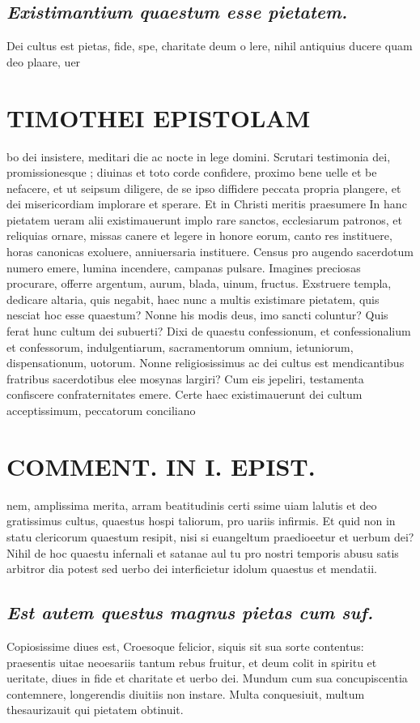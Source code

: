 \documentclass{article}
\begin{document}
\begin{pages}
\subsection*{\textit{Existimantium quaestum esse pietatem. }}\pstart Dei cultus est pietas, fide, spe, charitate deum o lere, nihil antiquius ducere quam deo plaare, uer\pend
\section*{TIMOTHEI EPISTOLAM }
\marginpar{[ p.161 ]}\pstart bo dei insistere, meditari die ac nocte in lege domini. Scrutari testimonia dei, promissionesque ; diuinas et toto corde confidere, proximo bene uelle et be nefacere, et ut seipsum diligere, de se ipso diffidere peccata propria plangere, et dei misericordiam implorare et sperare. Et in Christi meritis praesumere In hanc pietatem ueram alii existimauerunt implo rare sanctos, ecclesiarum patronos, et reliquias ornare, missas canere et legere in honore eorum, canto res instituere, horas canonicas exoluere, anniuersaria instituere. Census pro augendo sacerdotum numero emere, lumina incendere, campanas pulsare. Imagines preciosas procurare, offerre argentum, aurum, blada, uinum, fructus. Exstruere templa, dedicare altaria, quis negabit, haec nunc a multis existimare pietatem, quis nesciat hoc esse quaestum? Nonne his modis deus, imo sancti coluntur? Quis ferat hunc cultum dei subuerti? Dixi de quaestu confessionum, et confessionalium et confessorum, indulgentiarum, sacramentorum omnium, ietuniorum, dispensationum, uotorum. Nonne religiosissimus ac dei cultus est mendicantibus fratribus sacerdotibus elee mosynas largiri? Cum eis jepeliri, testamenta confiscere confraternitates emere. Certe haec existimauerunt dei cultum acceptissimum, peccatorum conciliano\pend
\section*{COMMENT. IN I. EPIST. }
\marginpar{[ p.162 ]}\pstart nem, amplissima merita, arram beatitudinis certi ssime uiam lalutis et deo gratissimus cultus, quaestus hospi taliorum, pro uariis infirmis. Et quid non in statu clericorum quaestum resipit, nisi si euangeltum praedioeetur et uerbum dei? Nihil de hoc quaestu infernali et satanae aul tu pro nostri temporis abusu satis arbitror dia potest sed uerbo dei interficietur idolum quaestus et mendatii.  \pend
{}
{}
\subsection*{\textit{Est autem questus magnus pietas cum suf. }}\pstart Copiosissime diues est, Croesoque felicior, siquis sit sua sorte contentus: praesentis uitae neoesariis tantum rebus fruitur, et deum colit in spiritu et ueritate, diues in fide et charitate et uerbo dei. Mundum cum sua concupiscentia contemnere, longerendis diuitiis non instare. Multa conquesiuit, multum thesaurizauit qui pietatem obtinuit.  \pend
{}
{}

\end{pages}
\end{document}
